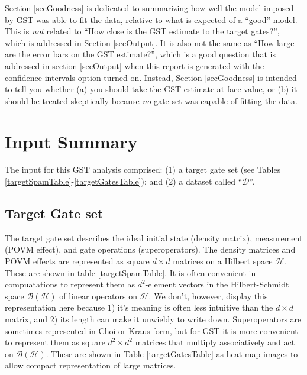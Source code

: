 \documentclass{article}[11pt]
\begin{document}
Section \ref{secGoodness} is dedicated to summarizing how well the model imposed by GST was able to fit the data, relative to what is expected of a ``good'' model.  This is \emph{not} related to ``How close is the GST estimate to the target gates?'', which is addressed in Section \ref{secOutput}.  It is also not the same as ``How large are the error bars on the GST estimate?'', which is a good question that is addressed in section \ref{secOutput} when this report is generated with the confidence intervals option turned on.  Instead, Section \ref{secGoodness} is intended to tell you whether (a) you should take the GST estimate at face value, or (b) it should be treated skeptically because \emph{no} gate set was capable of fitting the data.


\section{Input Summary\label{secInput}}
The input for this GST analysis comprised: (1) a target gate set (see Tables \ref{targetSpamTable}-\ref{targetGatesTable}); and (2) a dataset called ``$\mathcal{D}$''.

\subsection{Target Gate set}

The target gate set describes the ideal initial state (density matrix), measurement (POVM effect), and gate operations (superoperators).  The density matrices and POVM effects are represented as square $d\times d$ matrices on a Hilbert space $\mathcal{H}$.  These are shown in table \ref{targetSpamTable}.  It is often convenient in compuatations to represent them as $d^2$-element vectors in the Hilbert-Schmidt space $\mathcal{B}(\mathcal{H})$ of linear operators on $\mathcal{H}$.  We don't, however, display this representation here because 1) it's meaning is often less intuitive than the $d\times d$ matrix, and 2) its length can make it unwieldy to write down.  Superoperators are sometimes represented in Choi or Kraus form, but for GST it is more convenient to represent them as square $d^2\times d^2$ matrices that multiply associatively and act on $\mathcal{B}(\mathcal{H})$.  These are shown in Table \ref{targetGatesTable} as heat map images to allow compact representation of large matrices.
\end{document}
